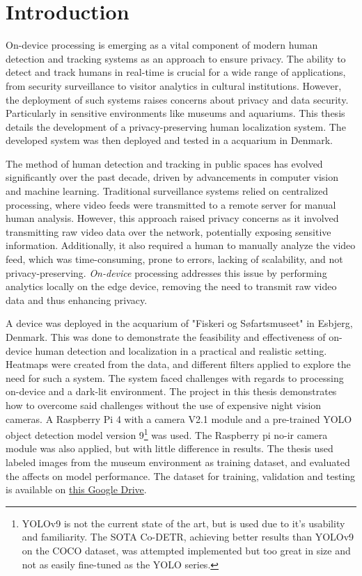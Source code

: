 \section{Introduction}
On-device processing is emerging as a vital component of modern human detection and tracking systems as an approach to ensure privacy. The ability to detect and track humans in real-time is crucial for a wide range of applications, from security surveillance to visitor analytics in cultural institutions. However, the deployment of such systems raises concerns about privacy and data security. Particularly in sensitive environments like museums and aquariums. This thesis details the development of a privacy-preserving human localization system. The developed system was then deployed and tested in a acquarium in Denmark.

The method of human detection and tracking in public spaces has evolved significantly over the past decade, driven by advancements in computer vision and machine learning. Traditional surveillance systems relied on centralized processing, where video feeds were transmitted to a remote server for manual human analysis. However, this approach raised privacy concerns as it involved transmitting raw video data over the network, potentially exposing sensitive information. Additionally, it also required a human to manually analyze the video feed, which was time-consuming, prone to errors, lacking of scalability, and not privacy-preserving. \textit{On-device} processing addresses this issue by performing analytics locally on the edge device, removing the need to transmit raw video data and thus enhancing privacy.

A device was deployed in the acquarium of "Fiskeri og Søfartsmuseet" in Esbjerg, Denmark. This was done to demonstrate the feasibility and effectiveness of on-device human detection and localization in a practical and realistic setting. Heatmaps were created from the data, and different filters applied to explore the need for such a system. The system faced challenges with regards to processing on-device and a dark-lit environment. The project in this thesis demonstrates how to overcome said challenges without the use of expensive night vision cameras. A Raspberry Pi 4 with a camera V2.1 module and a pre-trained YOLO object detection model version 9\footnote{YOLOv9 is not the current state of the art, but is used due to it's usability and familiarity. The SOTA Co-DETR, achieving better results than YOLOv9 on the COCO dataset, was attempted implemented but too great in size and not as easily fine-tuned as the YOLO series.} was used. The Raspberry pi no-ir camera module was also applied, but with little difference in results. The thesis used labeled images from the museum environment as training dataset, and evaluated the affects on model performance. The dataset for training, validation and testing is available on \href{https://drive.google.com/drive/folders/1_JXkpCqhaTc95XMjBc--Bkt0tH0Kdp-4?usp=sharing}{this Google Drive}.


